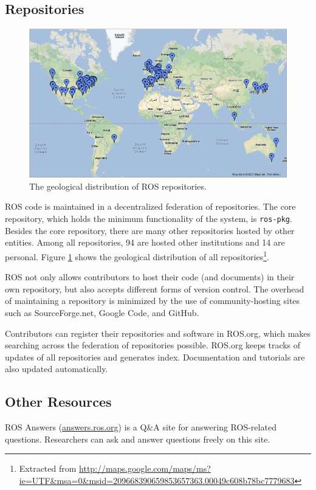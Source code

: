 \documentclass[a4paper, 10pt, conference]{ieeeconf}       %
\begin{document}
\subsection{Repositories}

\begin{figure}[tbhp]
  \centering
  \includegraphics[width=.9\textwidth]{repos}
  \caption{The geological distribution of ROS repositories.}
  \label{fig:repos}
\end{figure}

ROS code is maintained in a decentralized federation of repositories. The core repository, which holds the minimum functionality of the system, is \texttt{ros-pkg}. Besides the core repository, there are many other repositories hosted by other entities. Among all repositories, 94 are hosted other institutions and 14 are personal. Figure \ref{fig:repos} shows the geological distribution of all repositories\footnote{Extracted from \url{http://maps.google.com/maps/ms?ie=UTF\&msa=0\&msid=209668390659853657363.00049c608b78bc7779683}}.

ROS not only allows contributors to host their code (and documents) in their own repository, but also accepts different forms of version control. The overhead of maintaining a repository is minimized by the use of community-hosting sites such as SourceForge.net, Google
Code, and GitHub.

Contributors can register their repositories and software in ROS.org, which makes searching across the federation of repositories possible. ROS.org keeps tracks of updates of all repositories and generates index. Documentation and tutorials are also updated automatically.


\subsection{Other Resources}
ROS Answers (\url{answers.ros.org}) is a Q\&A site for answering ROS-related questions. Researchers can ask and answer questions freely on this site.
\end{document}
